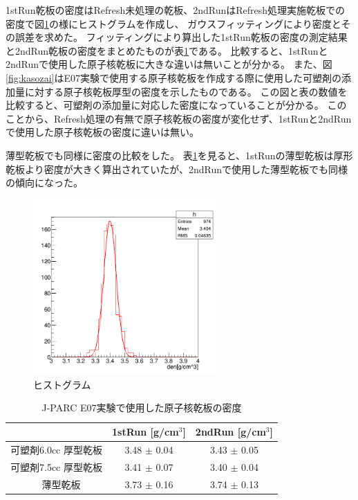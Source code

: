 \documentclass[12pt,a4paper]{jarticle}
\begin{document}
\par
1stRun乾板の密度はRefresh未処理の乾板、2ndRunはRefresh処理実施乾板での密度で図\ref{fig:hisuto}の様にヒストグラムを作成し、
ガウスフィッティングにより密度とその誤差を求めた。
フィッティングにより算出した1stRun乾板の密度の測定結果と2ndRun乾板の密度をまとめたものが表\ref{tab:compare_E07_12}である。
比較すると、1stRunと2ndRunで使用した原子核乾板に大きな違いは無いことが分かる。
また、図\ref{fig:kasozai}はE07実験で使用する原子核乾板を作成する際に使用した可塑剤の添加量に対する原子核乾板厚型の密度を示したものである。
この図と表の数値を比較すると、可塑剤の添加量に対応した密度になっていることが分かる。
このことから、Refresh処理の有無で原子核乾板の密度が変化せず、1stRunと2ndRunで使用した原子核乾板の密度に違いは無い。
\par
薄型乾板でも同様に密度の比較をした。
表\ref{tab:compare_E07_12}を見ると、1stRunの薄型乾板は厚形乾板より密度が大きく算出されていたが、2ndRunで使用した薄型乾板でも同様の傾向になった。
\begin{figure}[htbp]
  \centering
     \includegraphics[width=70mm]{thick75_den.png}
  \caption{ヒストグラム\label{fig:hisuto}}
\end{figure}
\begin{table}[htbp]
  \centering
  \caption{J-PARC E07実験で使用した原子核乾板の密度\label{tab:compare_E07_12}}
  \begin{tabular}{c|c|c}
  　　　&1stRun [g/cm$^3$]&2ndRun [g/cm$^3$]\\
  \hline
  \hline
  可塑剤6.0cc 厚型乾板 & 3.48 $\pm$ 0.04 & 3.43 $\pm$ 0.05 \\
  可塑剤7.5cc 厚型乾板 & 3.41 $\pm$ 0.07 & 3.40 $\pm$ 0.04 \\
　薄型乾板 & 3.73 $\pm$ 0.16 & 3.74 $\pm$ 0.13 \\
  \hline
  \end{tabular}
\end{table}
\end{document}
